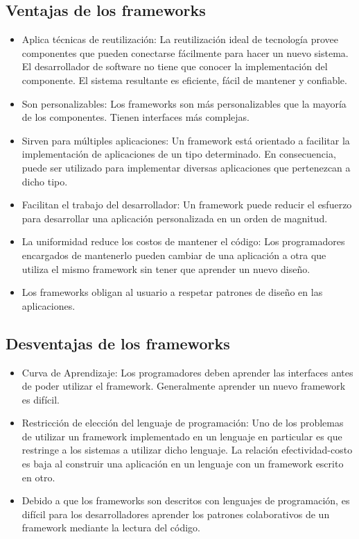 \subsection {Ventajas de los frameworks}
\begin{itemize}
	\item Aplica técnicas de reutilización: La reutilización ideal de tecnología
	provee componentes que pueden conectarse fácilmente para hacer un nuevo sistema.
	El desarrollador de software no tiene que conocer la implementación del
	componente. El sistema resultante es eficiente, fácil de mantener y
	confiable.
	
	\item Son personalizables: Los frameworks son más
	personalizables que la mayoría de los componentes. Tienen interfaces más
	complejas.
	
	\item Sirven para múltiples aplicaciones: Un framework está orientado a
	facilitar la implementación de aplicaciones de un tipo determinado. En
	consecuencia, puede ser utilizado para implementar diversas aplicaciones que
	pertenezcan a dicho tipo.
	
	\item Facilitan el trabajo del desarrollador: Un framework puede reducir
	el esfuerzo para desarrollar una aplicación personalizada en un orden de magnitud.
	
	\item La uniformidad reduce los costos de mantener el código: Los programadores
	encargados de mantenerlo pueden cambiar de una aplicación a otra que utiliza el
	mismo framework sin tener que aprender un nuevo diseño.
	
	\item Los frameworks obligan al usuario a respetar patrones de diseño en las
	aplicaciones.

\end{itemize}

\subsection {Desventajas de los frameworks}
\begin{itemize}
    \item Curva de Aprendizaje: Los programadores deben aprender las interfaces
    antes de poder utilizar el framework. Generalmente aprender un nuevo
    framework es difícil.
    
    \item Restricción de elección del lenguaje de programación: Uno de los
    problemas de utilizar un framework implementado en un lenguaje en particular
    es que restringe a los sistemas a utilizar dicho lenguaje. La relación
    efectividad-costo es baja al construir una aplicación en un lenguaje con un
    framework escrito en otro.
    
    \item Debido a que los frameworks son descritos con lenguajes de
    programación, es difícil para los desarrolladores aprender los patrones
    colaborativos de un framework mediante la lectura del código.
    
\end{itemize}

